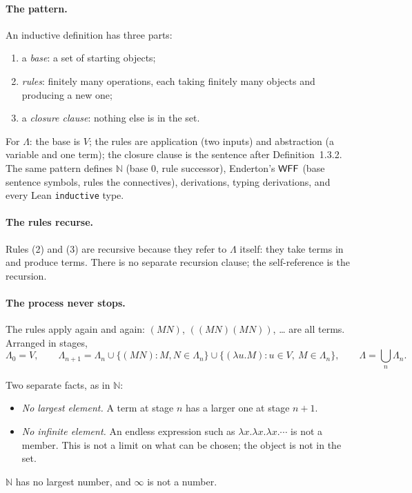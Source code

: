 \documentclass[11pt]{article}
\newcommand{\Lam}{\Lambda}
\newcommand{\Var}{V}
\begin{document}
\begin{remark}\label{rem:inductive-pattern}

\paragraph{The pattern.} An inductive definition has three parts:
\begin{enumerate}[label=(\roman*)]
  \item a \emph{base}: a set of starting objects;
  \item \emph{rules}: finitely many operations, each taking finitely many
        objects and producing a new one;
  \item a \emph{closure clause}: nothing else is in the set.
\end{enumerate}
For $\Lam$: the base is $\Var$; the rules are application (two inputs) and
abstraction (a variable and one term); the closure clause is the sentence
after Definition~1.3.2. The same pattern defines $\mathbb{N}$ (base $0$, rule
successor), Enderton's $\mathsf{WFF}$ (base sentence symbols, rules the connectives),
derivations, typing derivations, and every Lean \texttt{inductive} type.

\paragraph{The rules recurse.} Rules (2) and (3) are recursive because they
refer to $\Lam$ itself: they take terms in and produce terms. There is no
separate recursion clause; the self-reference is the recursion.

\paragraph{The process never stops.} The rules apply again and again:
$(MN)$, $((MN)(MN))$, \dots{} are all terms. Arranged in stages,
\[
  \Lam_0 = \Var, \qquad
  \Lam_{n+1} = \Lam_n \cup \{(MN) : M,N \in \Lam_n\}
               \cup \{(\lambda u.M) : u \in \Var,\ M \in \Lam_n\},
  \qquad
  \Lam = \bigcup_{n} \Lam_n .
\]
\begin{center}
\end{center}
Two separate facts, as in $\mathbb{N}$:
\begin{itemize}
  \item \emph{No largest element.} A term at stage $n$ has a larger one at
        stage $n+1$.
  \item \emph{No infinite element.} An endless expression such as
        $\lambda x.\lambda x.\lambda x.\cdots$ is not a member. This is not a
        limit on what can be chosen; the object is not in the set.
\end{itemize}
$\mathbb{N}$ has no largest number, and $\infty$ is not a number.


\end{remark}
\end{document}
